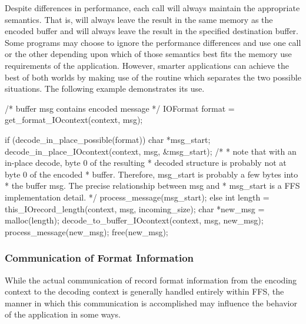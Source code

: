 Despite differences in performance, each call will always maintain the
appropriate semantics.
That is,  will always leave the result in
the same memory as the encoded buffer and  will
always leave the result in the specified destination buffer.  Some programs
may choose to ignore the performance differences and use one call or the other
depending upon which of those semantics best fits the memory use requirements
of the application.  However, smarter applications can achieve the best of
both worlds by making use of the  routine
which separates the two possible situations.  The following example
demonstrates its use.
\begin{Code}
    /* buffer msg contains encoded message */
    IOFormat format = get_format_IOcontext(context, msg);

    if (decode_in_place_possible(format)) {
        char *msg_start;
        decode_in_place_IOcontext(context, msg, &msg_start);
        /*
         * note that with an in-place decode, byte 0 of the resulting
         * decoded structure is probably not at byte 0 of the encoded
         * buffer.  Therefore, msg_start is probably a few bytes into
         * the buffer msg.  The precise relationship between msg and
         * msg_start is a FFS implementation detail.
         */
        process_message(msg_start);
    } else {
        int length = this_IOrecord_length(context, msg, incoming_size);
        char *new_msg = malloc(length);
        decode_to_buffer_IOcontext(context, msg, new_msg);
        process_message(new_msg);
        free(new_msg);
    }

\end{Code}
\subsubsection{Communication of Format Information\label{sec:formats}}
While the actual communication of record format information from the
encoding context to the decoding context is generally handled entirely
within FFS, the manner in which this communication is accomplished may
influence the behavior of the application in some ways.

